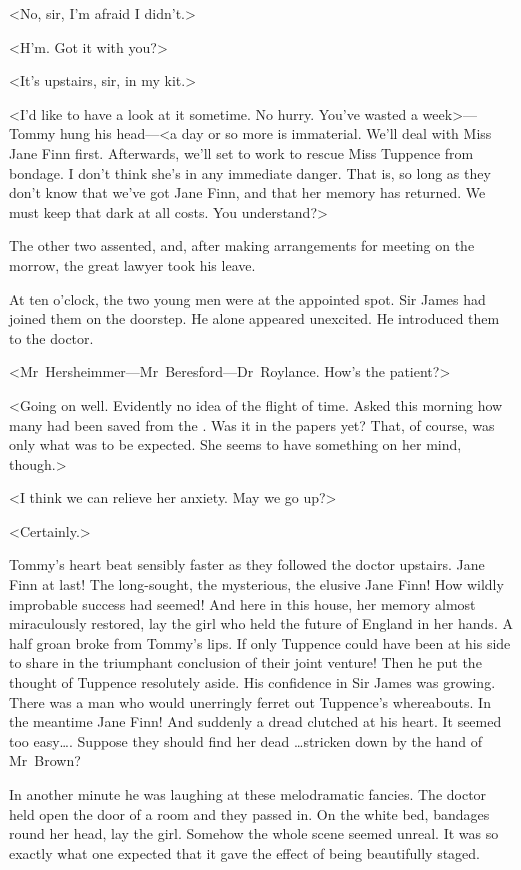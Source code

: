 <No, sir, I'm afraid I didn't.>

<H'm. Got it with you?>

<It's upstairs, sir, in my kit.>

<I'd like to have a look at it sometime. No hurry. You've wasted a week>—Tommy hung his head—<a day or so more is immaterial. We'll deal with Miss Jane Finn first. Afterwards, we'll set to work to rescue Miss Tuppence from bondage. I don't think she's in any immediate danger. That is, so long as they don't know that we've got Jane Finn, and that her memory has returned. We must keep that dark at all costs. You understand?>

The other two assented, and, after making arrangements for meeting on the morrow, the great lawyer took his leave.

At ten o'clock, the two young men were at the appointed spot. Sir James had joined them on the doorstep. He alone appeared unexcited. He introduced them to the doctor.

<Mr~Hersheimmer—Mr~Beresford—Dr~Roylance. How's the patient?>

<Going on well. Evidently no idea of the flight of time. Asked this morning how many had been saved from the . Was it in the papers yet? That, of course, was only what was to be expected. She seems to have something on her mind, though.>

<I think we can relieve her anxiety. May we go up?>

<Certainly.>

Tommy's heart beat sensibly faster as they followed the doctor upstairs. Jane Finn at last! The long-sought, the mysterious, the elusive Jane Finn! How wildly improbable success had seemed! And here in this house, her memory almost miraculously restored, lay the girl who held the future of England in her hands. A half groan broke from Tommy's lips. If only Tuppence could have been at his side to share in the triumphant conclusion of their joint venture! Then he put the thought of Tuppence resolutely aside. His confidence in Sir James was growing. There was a man who would unerringly ferret out Tuppence's whereabouts. In the meantime Jane Finn! And suddenly a dread clutched at his heart. It seemed too easy\dots. Suppose they should find her dead \dots stricken down by the hand of Mr~Brown?

In another minute he was laughing at these melodramatic fancies. The doctor held open the door of a room and they passed in. On the white bed, bandages round her head, lay the girl. Somehow the whole scene seemed unreal. It was so exactly what one expected that it gave the effect of being beautifully staged.

